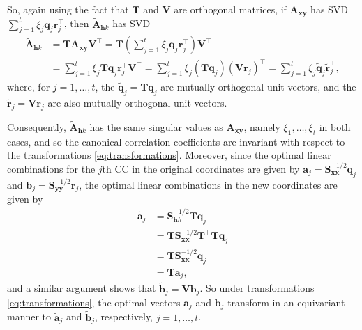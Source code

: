 \documentclass[]{book}
\theoremstyle{definition}
\theoremstyle{definition}
\theoremstyle{definition}
\theoremstyle{remark}
\begin{document}
So, again using the fact that \(\mathbf T\) and \(\mathbf V\) are orthogonal matrices, if \(\boldsymbol A_{\boldsymbol x\boldsymbol y}\) has SVD \(\sum_{j=1}^t \xi_j {\mathbf q}_j {\mathbf r}_j^\top\), then \(\tilde{\boldsymbol A}_{\mathbf hk}\) has SVD
\begin{align*}
\tilde{\boldsymbol A}_{\mathbf hk}&={\mathbf T }\boldsymbol A_{\boldsymbol x\boldsymbol y}{\mathbf V}^\top
={\mathbf T} \left ( \sum_{j=1}^t \xi_j {\mathbf q}_j {\mathbf r}_j^\top \right){\mathbf V}^\top\\
&=\sum_{j=1}^t \xi_j {\mathbf T}{\mathbf q}_j {\mathbf r}_j^\top {\mathbf V}^\top
=\sum_{j=1}^t \xi_j \left ( {\mathbf T} {\mathbf q}_j \right )\left ({\mathbf V}{\mathbf r}_j  \right )^\top
=\sum_{j=1}^t \xi_j \tilde{\boldsymbol q}_j \tilde{\mathbf r}_j^\top,
\end{align*}
where, for \(j=1, \ldots,t\), the \(\tilde{\boldsymbol q}_j={\mathbf T}\boldsymbol q_j\) are mutually orthogonal unit vectors,
and the \(\tilde{\mathbf r}_j={\mathbf V}{\mathbf r}_j\) are also mutually orthogonal unit vectors.

Consequently, \(\tilde{\boldsymbol A}_{\mathbf h k}\) has the same singular values as \(\boldsymbol A_{\boldsymbol x\boldsymbol y}\), namely \(\xi_1, \ldots , \xi_t\) in both cases, and so the canonical correlation coefficients are invariant with respect to the transformations \eqref{eq:transformations}. Moreover, since the optimal linear combinations for the \(j\)th CC in the original coordinates are given by \(\boldsymbol a_j =\boldsymbol S_{\boldsymbol x\boldsymbol x}^{-1/2}{\mathbf q}_j\) and \(\boldsymbol b_j=\boldsymbol S_{\boldsymbol y\boldsymbol y}^{-1/2}{\mathbf r}_j\), the optimal linear combinations in the new coordinates are given by
\begin{align*}
\tilde{\boldsymbol a}_{j}&=\boldsymbol S_{\mathbf hh}^{-1/2}{\mathbf T}{\mathbf q}_j\\
&={\mathbf T}\boldsymbol S_{\boldsymbol x\boldsymbol x}^{-1/2}{\mathbf T}^\top {\mathbf T}{\mathbf q}_j\\
&={\mathbf T}\boldsymbol S_{\boldsymbol x\boldsymbol x}^{-1/2}{\mathbf q}_j \\
&={\mathbf T}\boldsymbol a_{j},
\end{align*}
and a similar argument shows that \(\tilde{\boldsymbol b}_{j}={\mathbf V}\boldsymbol b_{j}\). So under transformations \eqref{eq:transformations},
the optimal vectors \(\boldsymbol a_{j}\) and \(\boldsymbol b_{j}\) transform in an equivariant manner to \(\tilde{\boldsymbol a}_{j}\) and \(\tilde{\boldsymbol b}_{j}\), respectively, \(j=1, \ldots , t\).
\end{document}
